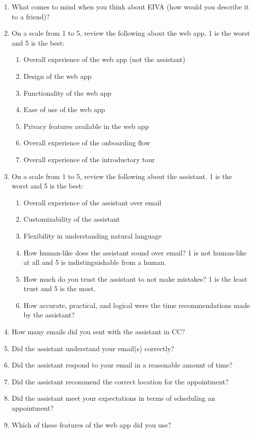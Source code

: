 \documentclass{article}
\begin{document}
\begin{enumerate}
	\item What comes to mind when you think about EIVA (how would you describe it to a friend)?
	\item On a scale from 1 to 5, review the following about the web app. 1 is the worst and 5 is the best:
	\begin{enumerate}
		\item Overall experience of the web app (not the assistant)
		\item Design of the web app
		\item Functionality of the web app
		\item Ease of use of the web app
		\item Privacy features available in the web app
		\item Overall experience of the onboarding flow
		\item Overall experience of the introductory tour
	\end{enumerate}
	\item On a scale from 1 to 5, review the following about the assistant. 1 is the worst and 5 is the best:
	\begin{enumerate}
		\item Overall experience of the assistant over email
		\item Customizability of the assistant
		\item Flexibility in understanding natural language
		\item How human-like does the assistant sound over email? 1 is not human-like at all and 5 is indistinguishable from a human.
		\item How much do you trust the assistant to not make mistakes? 1 is the least trust and 5 is the most.
		\item How accurate, practical, and logical were the time recommendations made by the assistant?
	\end{enumerate}
	\item How many emails did you sent with the assistant in CC?
	\item Did the assistant understand your email(s) correctly?
	\item Did the assistant respond to your email in a reasonable amount of time?
	\item Did the assistant recommend the correct location for the appointment?
	\item Did the assistant meet your expectations in terms of scheduling an appointment?
	\item Which of these features of the web app did you use?

\end{enumerate}
\end{document}
